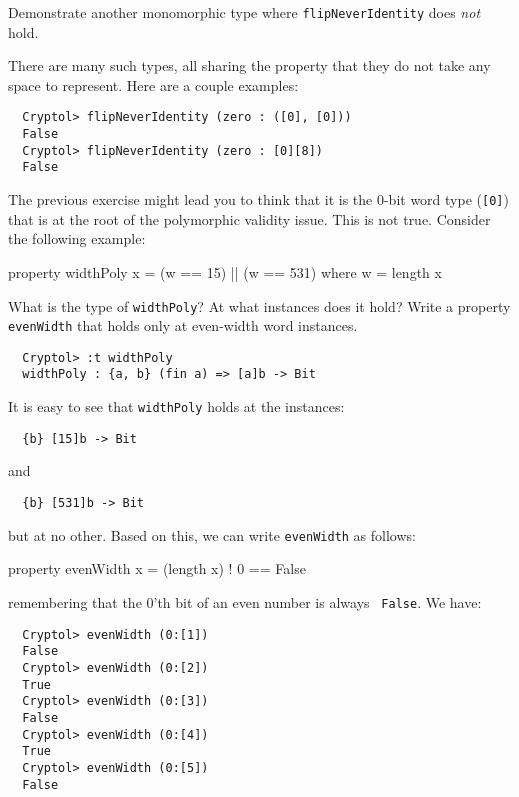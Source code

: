 \begin{Exercise}\label{ex:polythm:1}
  Demonstrate another monomorphic type where {\tt flipNeverIdentity}
  does \emph{not} hold.
\end{Exercise}
\begin{Answer}
  There are many such types, all sharing the property that they do not
  take any space to represent. Here are a couple examples:\indZero
\begin{Verbatim}
  Cryptol> flipNeverIdentity (zero : ([0], [0]))
  False
  Cryptol> flipNeverIdentity (zero : [0][8])
  False
\end{Verbatim}
\end{Answer}


\begin{Exercise}\label{ex:polythm:2}
  The previous exercise might lead you to think that it is the 0-bit
  word type ({\tt [0]}) that is at the root of the polymorphic
  validity issue.  This is not true. Consider the following
  example:\indLength\indThmPolyvalid
\begin{code}
  property widthPoly x = (w == 15) || (w == 531)
     where w = length x
\end{code}
What is the type of {\tt widthPoly}? At what instances does it hold?
Write a property {\tt evenWidth} that holds only at even-width word
instances.
\end{Exercise}
\begin{Answer}
\begin{Verbatim}
  Cryptol> :t widthPoly
  widthPoly : {a, b} (fin a) => [a]b -> Bit
\end{Verbatim}
It is easy to see that {\tt widthPoly} holds at the instances:
\begin{Verbatim}
  {b} [15]b -> Bit
\end{Verbatim}
and
\begin{Verbatim}
  {b} [531]b -> Bit
\end{Verbatim}
but at no other. Based on this, we can write {\tt evenWidth} as
follows:\indLength
\begin{code}
  property evenWidth x = (length x) ! 0 == False
\end{code}
remembering that the 0'th bit of an even number is always {\tt
  False}. We have:
\begin{Verbatim}
  Cryptol> evenWidth (0:[1])
  False
  Cryptol> evenWidth (0:[2])
  True
  Cryptol> evenWidth (0:[3])
  False
  Cryptol> evenWidth (0:[4])
  True
  Cryptol> evenWidth (0:[5])
  False
\end{Verbatim}
\end{Answer}

